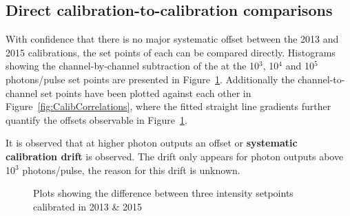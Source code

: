 \documentclass[12pt]{report}
\begin{document}
\subsection{Direct calibration-to-calibration comparisons}
\label{subsec:calibToCalib}
With confidence that there is no major systematic offset between the 2013 and 2015 calibrations, the set points of each can be compared directly. Histograms showing the channel-by-channel subtraction of the at the 10$^3$, 10$^4$ and 10$^5$ photons/pulse set points are presented in Figure~\ref{fig:CalibToCalib}. Additionally the channel-to-channel set points have been plotted against each other in Figure~\ref{fig:CalibCorrelations}, where the fitted straight line gradients further quantify the offsets observable in Figure~\ref{fig:CalibToCalib}. 

It is observed that at higher photon outputs an offset or \textbf{systematic calibration drift} is observed. The drift only appears for photon outputs above 10$^3$ photons/pulse, the reason for this drift is unknown. 

\begin{figure}[]
	\centering
	\newline
	\caption{Plots showing the difference between three intensity setpoints calibrated in 2013 \& 2015 }
	\label{fig:CalibToCalib} 
\end{figure}
\end{document}
